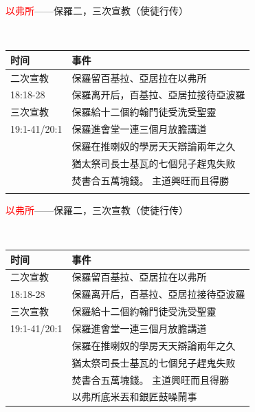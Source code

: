 \documentclass{beamer}
\begin{document}
\begin{frame}{\textcolor{red}{以弗所}——保羅二，三次宣教（使徒行传）}
\begin{block}{}\\
\begin{table}
\centering
\begin{tabular}{l|l}
时间 & 事件 \\\hline\hline
二次宣教&保羅留百基拉、亞居拉在以弗所 \\
18:18-28&保羅离开后，百基拉、亞居拉接待亞波羅 \\\hline\hline
三次宣教&保羅給十二個約翰門徒受洗受聖靈\\
19:1-41/20:1&保羅進會堂一連三個月放膽講道\\
&保羅在推喇奴的學房天天辯論兩年之久\\
&猶太祭司長士基瓦的七個兒子趕鬼失败\\
&焚書合五萬塊錢。 主道興旺而且得勝\\
&\\\hline\hline
\end{tabular}
\end{table}
\end{block}
\end{frame}




\begin{frame}{\textcolor{red}{以弗所}——保羅二，三次宣教（使徒行传）}
\begin{block}{}\\
\begin{table}
\centering
\begin{tabular}{l|l}
时间 & 事件 \\\hline\hline
二次宣教&保羅留百基拉、亞居拉在以弗所 \\
18:18-28&保羅离开后，百基拉、亞居拉接待亞波羅 \\\hline\hline
三次宣教&保羅給十二個約翰門徒受洗受聖靈 \\
19:1-41/20:1&保羅進會堂一連三個月放膽講道\\
&保羅在推喇奴的學房天天辯論兩年之久\\
&猶太祭司長士基瓦的七個兒子趕鬼失败\\
&焚書合五萬塊錢。 主道興旺而且得勝\\
&以弗所底米丟和銀匠鼓噪鬧事\\\hline\hline
\end{tabular}
\end{table}
\end{block}
\end{frame}
\end{document}
